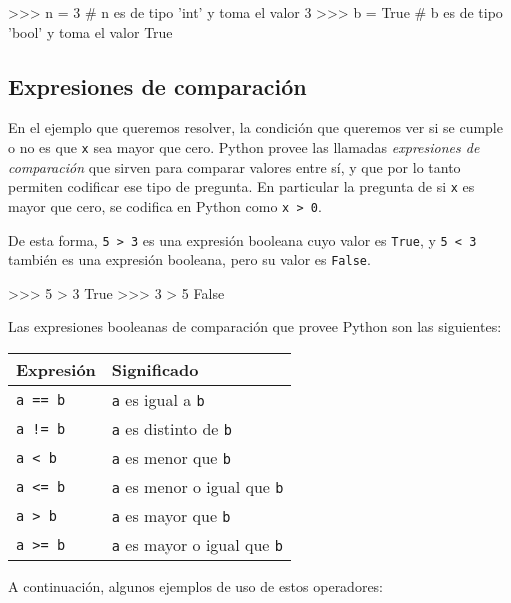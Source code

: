 \begin{codigo-python-sn}
>>> n = 3    # n es de tipo 'int' y toma el valor 3
>>> b = True # b es de tipo 'bool' y toma el valor True
\end{codigo-python-sn}

\subsection{Expresiones de comparación}

En el ejemplo que queremos resolver, la condición que queremos ver si se
cumple o no es que \lstinline!x! sea mayor que cero. Python provee las
llamadas \emph{expresiones de comparación} que sirven para comparar valores
entre sí, y que por lo tanto permiten codificar ese tipo de pregunta.  En
particular la pregunta de si \lstinline!x! es mayor que cero, se codifica
en Python como \lstinline!x > 0!.

De esta forma, \lstinline+5 > 3+ es una expresión booleana cuyo valor es
\lstinline!True!, y \lstinline+5 < 3+ también es una expresión booleana, pero su
valor es \lstinline!False!.

\begin{codigo-python-sn}
>>> 5 > 3
True
>>> 3 > 5
False
\end{codigo-python-sn}

Las expresiones
booleanas de comparación que provee Python son las siguientes:

\newcommand{\tablaComparacion}{
\begin{center}
\begin{tabular}[c]{l l}
{\bf Expresión} & {\bf Significado}\\
\hline
\lstinline!a == b!& \lstinline!a! es igual a \lstinline!b! \\
\lstinline+a != b+& \lstinline!a! es distinto de \lstinline!b! \\
\lstinline!a < b!& \lstinline!a! es menor que \lstinline!b! \\
\lstinline!a <= b!& \lstinline!a! es menor o igual que \lstinline!b! \\
\lstinline!a > b!& \lstinline!a! es mayor que \lstinline!b! \\
\lstinline!a >= b!& \lstinline!a! es mayor o igual que \lstinline!b! \\
\end{tabular}
\end{center}
}
\tablaComparacion

A continuación, algunos ejemplos de uso de estos operadores:

